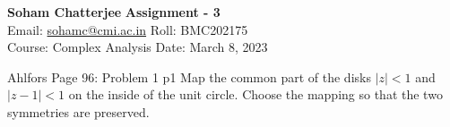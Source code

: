 \documentclass[a4paper, 11pt]{article}
\begin{document}
	
	
	\textsf{\noindent \large\textbf{Soham Chatterjee} \hfill \textbf{Assignment - 3}\\
		Email: \href{sohamc@cmi.ac.in}{sohamc@cmi.ac.in} \hfill Roll: BMC202175\\
		\normalsize Course: Complex Analysis \hfill Date: March 8, 2023}
	
	
	\begin{problem}{%
			Ahlfors Page 96: Problem 1
		}{p1%
		}
		Map the common part of the disks $|z|<1$ and $|z-1|<1$ on the inside of the unit circle. Choose the mapping so that the two symmetries are preserved.
	\end{problem}
	
\end{document}
